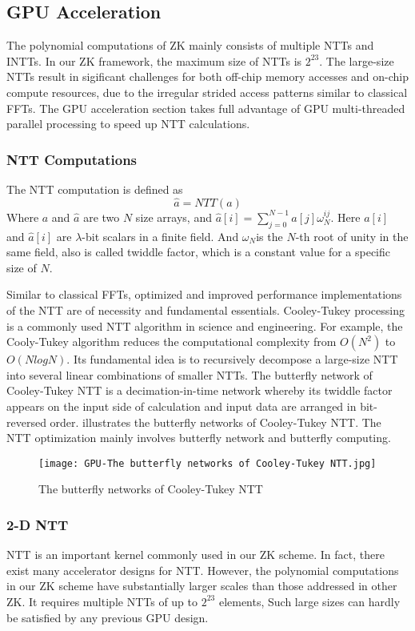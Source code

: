 \subsection{GPU Acceleration}\label{section: gpu-acceleration}
The polynomial computations of ZK mainly consists of multiple NTTs and INTTs. In our ZK framework, the maximum size of NTTs is $2^{23}$. The large-size NTTs result in sigificant challenges for both off-chip memory accesses and on-chip compute resources, due to the irregular strided access patterns similar to classical FFTs. The GPU acceleration section takes full advantage of GPU multi-threaded parallel processing to speed up NTT calculations.
\subsubsection{NTT Computations}
The NTT computation is defined as
\[\hat{a} = NTT{(a)}\]
Where $a$ and  $\hat{a}$ are two $N$ size arrays, and  $\hat{a}[i] = \sum_{j=0}^{N-1} a[j] \omega_N^{ij}$. Here $a[i]$ and $\hat{a}[i]$ are $\lambda$-bit scalars in a finite field. And $\omega_N$is the $N$-th root of unity in the same field, also is called twiddle factor, which is a constant value for a specific size of $N$.

Similar to classical FFTs, optimized and improved performance implementations of the NTT are of necessity and fundamental essentials. Cooley-Tukey processing is a commonly used NTT algorithm in science and engineering. For example, the Cooly-Tukey algorithm reduces the computational complexity from $O(N^2)$ to $O(NlogN)$. Its fundamental idea is to recursively decompose a large-size NTT into several linear combinations of smaller NTTs. The butterfly network of Cooley-Tukey NTT is a decimation-in-time network whereby its twiddle factor appears on the input side of calculation and input data are arranged in bit-reversed order.  illustrates the butterfly networks of Cooley-Tukey NTT. The NTT optimization mainly involves butterfly network and butterfly computing.
\begin{figure}[!ht]
    \centering
    \texttt{[image: GPU-The butterfly networks of Cooley-Tukey NTT.jpg]}
    \caption{The butterfly networks of Cooley-Tukey NTT}
    \label{fig:The Butterfly Networks of Cooley-Tukey NTT}
\end{figure}
\subsubsection{2-D NTT}
NTT is an important kernel commonly used in our ZK scheme. In fact, there exist many accelerator designs for NTT. However, the polynomial computations in our ZK scheme have substantially larger scales than those addressed in other ZK. It requires multiple NTTs of up to $2^{23}$ elements, Such large sizes can hardly be satisfied by any previous GPU design.

